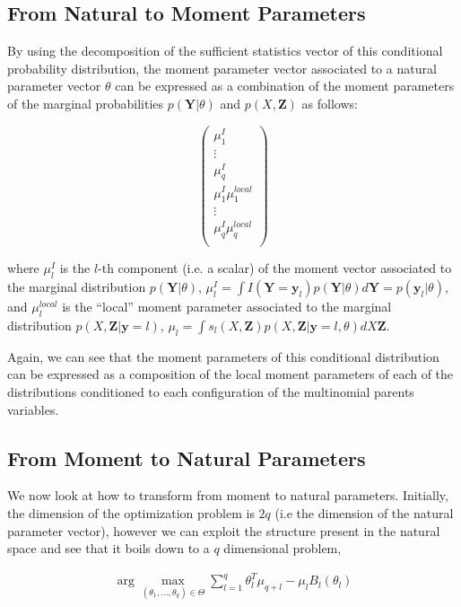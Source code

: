 \documentclass[11pt, oneside]{article}   	%
\newcommand{\bm}{\mathbf}
\numberwithin{figure}{section}
\numberwithin{equation}{section}
\numberwithin{table}{section}
\theoremstyle{definition}
\begin{document}
\subsection{From Natural to Moment Parameters}
\label{Section:CD_With_MParents:NaturalToMoment}


By using the decomposition of the sufficient statistics vector of this conditional probability distribution, the moment parameter vector associated to a natural parameter vector $\theta$ can be expressed as a combination of the moment parameters of the marginal probabilities $p(\bm Y|\theta)$ and $p(X, \bm Z)$ as follows:

$$ 
\begin{pmatrix}
\mu^{I}_1  \\
\vdots \\
\mu^{I}_q \\
\mu^{I}_1 \mu^{local}_1\\
\vdots \\
\mu^{I}_q \mu^{local}_q\\
\end{pmatrix}
$$

\noindent where  $\mu^{I}_l$ is the $l$-th component (i.e. a scalar) of the moment vector associated to the marginal distribution $p(\bm Y|\theta)$,  $\mu^{I}_l  = \int I(\bm Y = \bm y_l) p(\bm Y|\theta) d\bm Y= p(\bm y_l|\theta)$, and $\mu^{local}_l$  is the ``local'' moment parameter associated to the marginal distribution $p(X,\bm Z| \bm y = l)$, $\mu_l = \int s_l(X, \bm Z)p(X,\bm Z|\bm y = l, \theta) dX\bm Z$. 

Again, we can see that the moment parameters of this conditional distribution can be expressed as a composition of the local moment parameters of each of the distributions conditioned to each configuration of the multinomial parents variables. 

\subsection{From Moment to Natural Parameters}
\label{Section:CD_With_MParents:MomentToNatural}

We now look at how to transform from moment to natural parameters. Initially, the dimension of the optimization problem is $2q$ (i.e the dimension of the natural parameter vector), however we can exploit the structure present in the natural space and see that it boils down to a $q$ dimensional problem, 

\begin{eqnarray*}
\arg\max_{(\theta_1,\ldots, \theta_q) \in \Theta} \sum_{l=1}^q \theta_l^T \mu_{q+l}- \mu_l B_l(\theta_l)
\end{eqnarray*}
\end{document}
